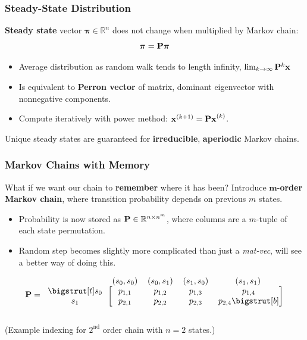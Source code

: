 \documentclass{beamer}
\begin{document}
\begin{frame}
\frametitle{Steady-State Distribution}

\begin{block}{}
\textbf{Steady state} vector $\boldsymbol{\pi} \in \mathbb{R}^n$ does not change when multiplied by Markov chain:
\[ \boldsymbol{\pi} = {\bf P} \boldsymbol{\pi} \]
\end{block}

\begin{itemize}
\item Average distribution as random walk tends to length infinity, $\lim_{k\to\infty} {\bf P}^k{\bf x}$
\item Is equivalent to \textbf{Perron vector} of matrix, dominant eigenvector with nonnegative components.
\item Compute iteratively with power method: ${\bf x}^{(k+1) } = {\bf Px}^{(k)}$.
\end{itemize}

\begin{block}{}
Unique steady states are guaranteed for \textbf{irreducible}, \textbf{aperiodic} Markov chains.
\end{block}

\end{frame}

\begin{frame}
\frametitle{Markov Chains with Memory}
What if we want our chain to \textbf{remember} where it has been?  Introduce $\boldsymbol{m}$-\textbf{order Markov chain}, where transition probability depends on previous $m$ states.

\begin{itemize}
\item Probability is now stored as ${\bf P} \in \mathbb{R}^{n \times n^m}$, where columns are a $m$-tuple of each state permutation.
\item Random step becomes slightly more complicated than just a \textit{mat-vec}, will see a better way of doing this.
\end{itemize}

\begin{block}{}

\[
{\bf P} =
\begin{blockarray}{ccccc}
& \left(s_0, s_0\right) & \left(s_0, s_1\right) & \left(s_1, s_0\right) & \left(s_1, s_1\right) \\
 \begin{block}{c[cccc]}
	\bigstrut[t]
	s_0 & p_{1,1} & p_{1,2} & p_{1,3} & p_{1,4} \\
	s_1 & p_{2,1} & p_{2,2} & p_{2,3} & p_{2,4}
	\bigstrut[b] \\
 \end{block}
\end{blockarray}
\]

\centering
\begin{tiny}
(Example indexing for $2^{\text{nd}}$ order chain with $n=2$ states.)
\end{tiny}

\end{block}

\end{frame}
\end{document}
